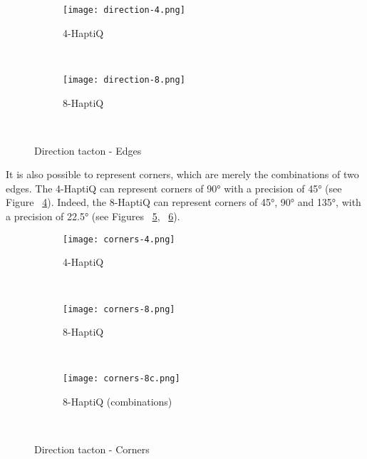 \begin{figure}[H]
        \centering
        \begin{subfigure}[H]{0.3\textwidth}
                \texttt{[image: direction-4.png]}
                \caption{4-HaptiQ}
                \label{fig:direction-4}
        \end{subfigure}%
        ~ %
        \begin{subfigure}[H]{0.5\textwidth}
                \texttt{[image: direction-8.png]}
                \caption{8-HaptiQ}
                \label{fig:direction-8}
        \end{subfigure}
        ~ %
        \caption{Direction tacton - Edges}\label{fig:edges}
\end{figure}

It is also possible to represent corners, which are merely the combinations of two edges. The 4-HaptiQ can represent corners of 90° with a precision of 45° (see Figure ~\ref{fig:corner-4}). Indeed, the 8-HaptiQ can represent corners of 45°, 90° and 135°, with a precision of 22.5° (see Figures ~\ref{fig:corner-8}, ~\ref{fig:corner-8c}). 

\begin{figure}[H]
        \centering
        \begin{subfigure}[H]{0.5\textwidth}
                \texttt{[image: corners-4.png]}
                \caption{4-HaptiQ}
                \label{fig:corner-4}
        \end{subfigure}%
        ~ %
          
        \begin{subfigure}[H]{0.4\textwidth}
                \texttt{[image: corners-8.png]}
                \caption{8-HaptiQ}
                \label{fig:corner-8}
        \end{subfigure}
        ~ 
         \begin{subfigure}[H]{0.5\textwidth}
                \texttt{[image: corners-8c.png]}
                \caption{8-HaptiQ (combinations)}
                \label{fig:corner-8c}
        \end{subfigure}
        ~ %
        \caption{Direction tacton - Corners}\label{fig:corners}
\end{figure}

